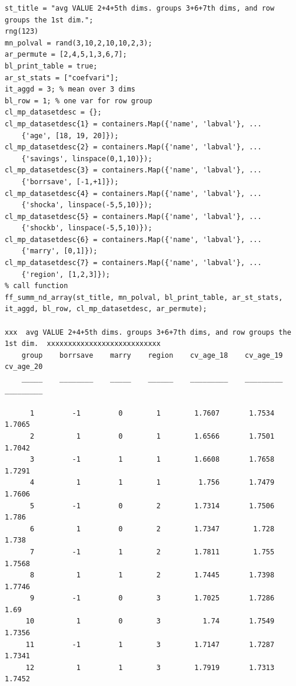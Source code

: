 \documentclass[
]{book}
\begin{document}
\begin{verbatim}
st_title = "avg VALUE 2+4+5th dims. groups 3+6+7th dims, and row groups the 1st dim.";
rng(123)
mn_polval = rand(3,10,2,10,10,2,3);
ar_permute = [2,4,5,1,3,6,7];
bl_print_table = true;
ar_st_stats = ["coefvari"];
it_aggd = 3; % mean over 3 dims
bl_row = 1; % one var for row group
cl_mp_datasetdesc = {};
cl_mp_datasetdesc{1} = containers.Map({'name', 'labval'}, ...
    {'age', [18, 19, 20]});
cl_mp_datasetdesc{2} = containers.Map({'name', 'labval'}, ...
    {'savings', linspace(0,1,10)});
cl_mp_datasetdesc{3} = containers.Map({'name', 'labval'}, ...
    {'borrsave', [-1,+1]});
cl_mp_datasetdesc{4} = containers.Map({'name', 'labval'}, ...
    {'shocka', linspace(-5,5,10)});
cl_mp_datasetdesc{5} = containers.Map({'name', 'labval'}, ...
    {'shockb', linspace(-5,5,10)});
cl_mp_datasetdesc{6} = containers.Map({'name', 'labval'}, ...
    {'marry', [0,1]});
cl_mp_datasetdesc{7} = containers.Map({'name', 'labval'}, ...
    {'region', [1,2,3]});
% call function
ff_summ_nd_array(st_title, mn_polval, bl_print_table, ar_st_stats, it_aggd, bl_row, cl_mp_datasetdesc, ar_permute);

xxx  avg VALUE 2+4+5th dims. groups 3+6+7th dims, and row groups the 1st dim.  xxxxxxxxxxxxxxxxxxxxxxxxxxx
    group    borrsave    marry    region    cv_age_18    cv_age_19    cv_age_20
    _____    ________    _____    ______    _________    _________    _________

      1         -1         0        1        1.7607       1.7534       1.7065  
      2          1         0        1        1.6566       1.7501       1.7042  
      3         -1         1        1        1.6608       1.7658       1.7291  
      4          1         1        1         1.756       1.7479       1.7606  
      5         -1         0        2        1.7314       1.7506        1.786  
      6          1         0        2        1.7347        1.728        1.738  
      7         -1         1        2        1.7811        1.755       1.7568  
      8          1         1        2        1.7445       1.7398       1.7746  
      9         -1         0        3        1.7025       1.7286         1.69  
     10          1         0        3          1.74       1.7549       1.7356  
     11         -1         1        3        1.7147       1.7287       1.7341  
     12          1         1        3        1.7919       1.7313       1.7452  
\end{verbatim}

\vspace{1em}
\end{document}
